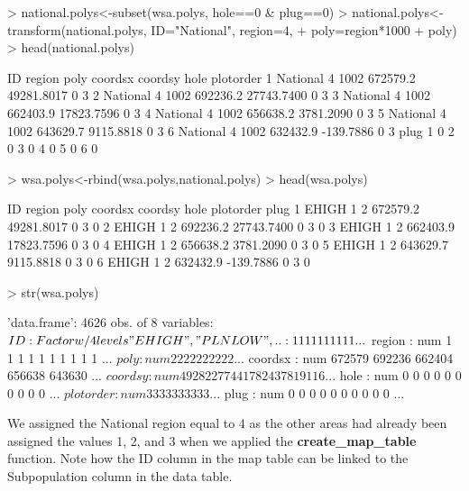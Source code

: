 \documentclass{article}
\begin{document}
\begin{Schunk}
\begin{Sinput}
> national.polys<-subset(wsa.polys, hole==0 & plug==0)
> national.polys<-transform(national.polys, ID="National", region=4,
+ poly=region*1000 + poly)
> head(national.polys)
\end{Sinput}
\begin{Soutput}
        ID region poly  coordsx    coordsy hole plotorder
1 National      4 1002 672579.2 49281.8017    0         3
2 National      4 1002 692236.2 27743.7400    0         3
3 National      4 1002 662403.9 17823.7596    0         3
4 National      4 1002 656638.2  3781.2090    0         3
5 National      4 1002 643629.7  9115.8818    0         3
6 National      4 1002 632432.9  -139.7886    0         3
  plug
1    0
2    0
3    0
4    0
5    0
6    0
\end{Soutput}
\begin{Sinput}
> wsa.polys<-rbind(wsa.polys,national.polys)
> head(wsa.polys)
\end{Sinput}
\begin{Soutput}
     ID region poly  coordsx    coordsy hole plotorder plug
1 EHIGH      1    2 672579.2 49281.8017    0         3    0
2 EHIGH      1    2 692236.2 27743.7400    0         3    0
3 EHIGH      1    2 662403.9 17823.7596    0         3    0
4 EHIGH      1    2 656638.2  3781.2090    0         3    0
5 EHIGH      1    2 643629.7  9115.8818    0         3    0
6 EHIGH      1    2 632432.9  -139.7886    0         3    0
\end{Soutput}
\begin{Sinput}
> str(wsa.polys)
\end{Sinput}
\begin{Soutput}
'data.frame':	4626 obs. of  8 variables:
 $ ID       : Factor w/ 4 levels "EHIGH","PLNLOW",..: 1 1 1 1 1 1 1 1 1 1 ...
 $ region   : num  1 1 1 1 1 1 1 1 1 1 ...
 $ poly     : num  2 2 2 2 2 2 2 2 2 2 ...
 $ coordsx  : num  672579 692236 662404 656638 643630 ...
 $ coordsy  : num  49282 27744 17824 3781 9116 ...
 $ hole     : num  0 0 0 0 0 0 0 0 0 0 ...
 $ plotorder: num  3 3 3 3 3 3 3 3 3 3 ...
 $ plug     : num  0 0 0 0 0 0 0 0 0 0 ...
\end{Soutput}
\end{Schunk}
We assigned the National region equal to 4 as the other areas had already been assigned the values 1, 2, and 3 when we applied the \textbf{create\_map\_table} function.  Note how the ID column in the map table can be linked to the Subpopulation column in the data table.
\end{document}
